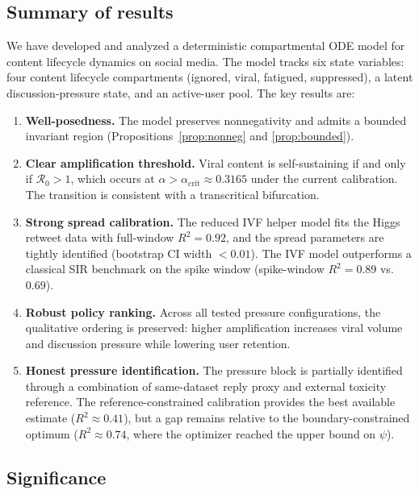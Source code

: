\documentclass[11pt]{article}
\begin{document}
\subsection{Summary of results}

We have developed and analyzed a deterministic compartmental ODE model for content lifecycle dynamics on social media. The model tracks six state variables: four content lifecycle compartments (ignored, viral, fatigued, suppressed), a latent discussion-pressure state, and an active-user pool. The key results are:

\begin{enumerate}[leftmargin=1.5em]
    \item \textbf{Well-posedness.} The model preserves nonnegativity and admits a bounded invariant region (Propositions~\ref{prop:nonneg} and \ref{prop:bounded}).

    \item \textbf{Clear amplification threshold.} Viral content is self-sustaining if and only if $\mathcal{R}_0 > 1$, which occurs at $\alpha > \alpha_{\mathrm{crit}} \approx 0.3165$ under the current calibration. The transition is consistent with a transcritical bifurcation.

    \item \textbf{Strong spread calibration.} The reduced IVF helper model fits the Higgs retweet data with full-window $R^2 = 0.92$, and the spread parameters are tightly identified (bootstrap CI width $< 0.01$). The IVF model outperforms a classical SIR benchmark on the spike window (spike-window $R^2 = 0.89$ vs.\ $0.69$).

    \item \textbf{Robust policy ranking.} Across all tested pressure configurations, the qualitative ordering is preserved: higher amplification increases viral volume and discussion pressure while lowering user retention.

    \item \textbf{Honest pressure identification.} The pressure block is partially identified through a combination of same-dataset reply proxy and external toxicity reference. The reference-constrained calibration provides the best available estimate ($R^2 \approx 0.41$), but a gap remains relative to the boundary-constrained optimum ($R^2 \approx 0.74$, where the optimizer reached the upper bound on $\psi$).
\end{enumerate}

\subsection{Significance}
\end{document}
